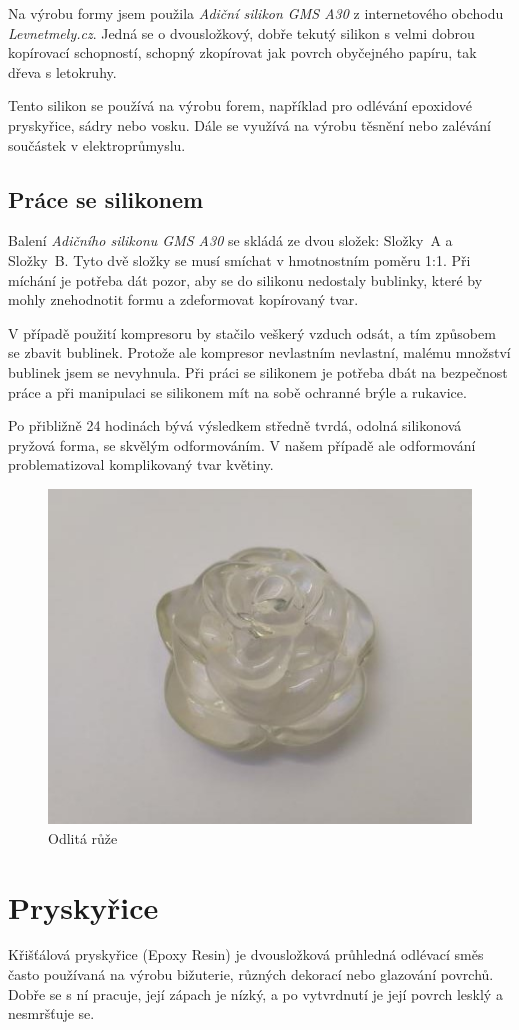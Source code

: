 Na výrobu formy jsem použila \textit{Adiční silikon GMS A30}\cite{silikon} z internetového obchodu \textit{Levnetmely.cz}\cite{tmely}. Jedná se o dvousložkový, dobře tekutý silikon s velmi dobrou kopírovací schopností, schopný zkopírovat jak povrch obyčejného papíru, tak dřeva s letokruhy.

Tento silikon se používá na výrobu forem, například pro odlévání epoxidové pryskyřice, sádry nebo vosku. Dále se využívá na výrobu těsnění nebo zalévání součástek v elektroprůmyslu.


\subsection{Práce se silikonem}
Balení \textit{Adičního silikonu GMS A30} se skládá ze dvou složek: Složky~A a Složky~B. Tyto dvě složky se musí smíchat v hmotnostním poměru 1:1. Při míchání je potřeba dát pozor, aby se do silikonu nedostaly bublinky, které by mohly znehodnotit formu a zdeformovat kopírovaný tvar.

V případě použití kompresoru by stačilo veškerý vzduch odsát, a tím způsobem se zbavit bublinek. Protože ale kompresor nevlastním nevlastní, malému množství bublinek jsem se nevyhnula. Při práci se silikonem je potřeba dbát na bezpečnost práce a při manipulaci se silikonem mít na sobě ochranné brýle a rukavice.


Po přibližně 24 hodinách bývá výsledkem středně tvrdá, odolná silikonová pryžová forma, se skvělým odformováním. V našem případě ale odformování problematizoval komplikovaný tvar květiny.


\begin{figure}[htbp]
	\centering
	\includegraphics[width=0.5
	\textwidth]{img/05 odl/Rose.jpg}
	\caption{Odlitá růže}
\end{figure}

\section{Pryskyřice}
Křišťálová pryskyřice\cite{pryskyrice} (Epoxy Resin) je dvousložková průhledná odlévací směs často používaná na výrobu bižuterie, různých dekorací nebo glazování povrchů. Dobře se s ní pracuje, její zápach je nízký, a po vytvrdnutí je její povrch lesklý a nesmršťuje se. 

